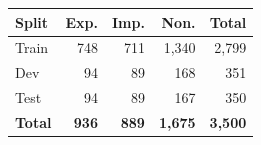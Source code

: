 \begin{tabular}{lrrrr}
\toprule
\textbf{Split} & \textbf{Exp.} & \textbf{Imp.} & \textbf{Non.} & \textbf{Total} \\
\midrule
Train & 748 & 711 & 1,340 & 2,799 \\
Dev & 94 & 89 & 168 & 351 \\
Test & 94 & 89 & 167 & 350 \\
\midrule
\textbf{Total} & \textbf{936} & \textbf{889} & \textbf{1,675} & \textbf{3,500} \\
\bottomrule
\end{tabular}
